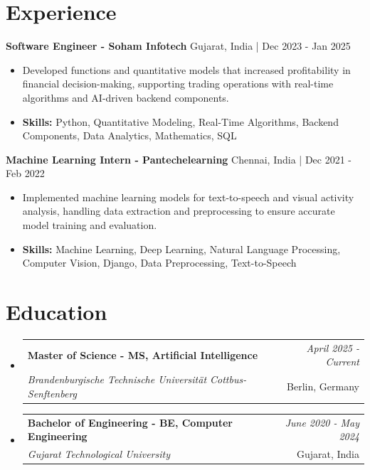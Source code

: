 \documentclass[a4paper,11pt]{article}
\makeatletter
\newcommand{\resumeSubheading}[4]{
\vspace{0.5mm}\item
    \begin{tabular*}{\linewidth}[t]{l@{\extracolsep{\fill}}r}
        \textbf{#1} & \textit{\footnotesize{#4}} \\
        \textit{\footnotesize{#3}} &  \footnotesize{#2}\\
    \end{tabular*}
    \vspace{-2.4mm}
}
\makeatother
\begin{document}
\section{\textbf{Experience}}


\vspace{1mm}
  \textbf{Software Engineer - Soham Infotech} \hfill Gujarat, India | Dec 2023 - Jan 2025
\vspace{-1.5mm} %
\begin{itemize}
  \item Developed functions and quantitative models that increased profitability in financial decision-making, supporting trading operations with real-time algorithms and AI-driven backend components.

\vspace{-2mm}
  \item \textbf{Skills:} Python, Quantitative Modeling, Real-Time Algorithms, Backend Components, Data Analytics, Mathematics, SQL
\end{itemize}

\vspace{1mm}
  \textbf{Machine Learning Intern - Pantechelearning} \hfill Chennai, India | Dec 2021 - Feb 2022
\vspace{-1.5mm} %
\begin{itemize}
  \item Implemented machine learning models for text-to-speech and visual activity analysis, handling data extraction and preprocessing to ensure accurate model training and evaluation.
\vspace{-2mm}
  \item \textbf{Skills:} Machine Learning, Deep Learning, Natural Language Processing, Computer Vision, Django, Data Preprocessing, Text-to-Speech
\end{itemize}\section{\textbf{Education}}
\vspace{-0.4mm}

\begin{itemize}[leftmargin=0.15in, label={}]
\resumeSubheading
{Master of Science - MS, Artificial Intelligence }{Berlin, Germany}
{Brandenburgische Technische Universität Cottbus-Senftenberg  }{April 2025 - Current}

\vspace{1.0mm} %
\resumeSubheading
{Bachelor of Engineering - BE, Computer Engineering  }{Gujarat, India}
{Gujarat Technological University }{June 2020 - May 2024}

\end{itemize}
\end{document}
